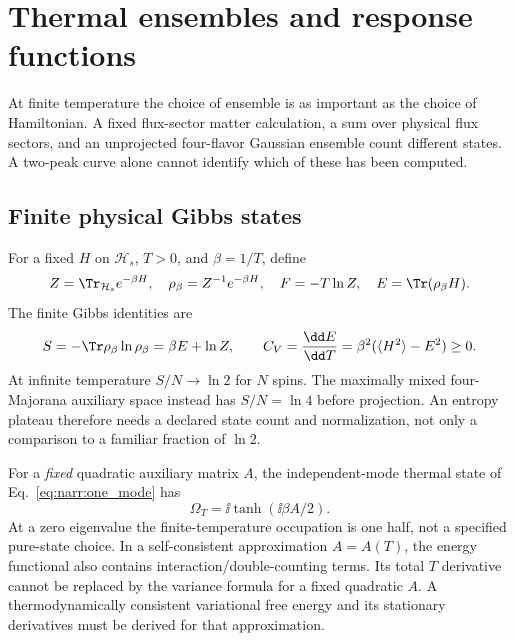 \chapter{Thermal ensembles and response functions}
\label{narr:thermal}

At finite temperature the choice of ensemble is as important as the choice of
Hamiltonian. A fixed flux-sector matter calculation, a sum over physical flux
sectors, and an unprojected four-flavor Gaussian ensemble count different states.
A two-peak curve alone cannot identify which of these has been computed.

\section{Finite physical Gibbs states}
For a fixed $H$ on $\mathcal H_s$, $T>0$, and $\beta=1/T$, define
\begin{equation}
 Z=\Tr_{\mathcal H_s}e^{-\beta H},\quad
 \rho_\beta=Z^{-1}e^{-\beta H},\quad
 F=-T\ln Z,\quad E=\Tr(\rho_\beta H).
\end{equation}
The finite Gibbs identities are
\begin{equation}
 S=-\Tr\rho_\beta\ln\rho_\beta=\beta E+\ln Z,
 \qquad C_V=\frac{\dd E}{\dd T}=\beta^2(\langle H^2\rangle-E^2)\geq0.
 \label{eq:narr:gibbs}
\end{equation}
At infinite temperature $S/N\to\ln2$ for $N$ spins. The maximally mixed
four-Majorana auxiliary space instead has $S/N=\ln4$ before projection.
An entropy plateau therefore needs a declared state count and normalization,
not only a comparison to a familiar fraction of $\ln2$.

For a \emph{fixed} quadratic auxiliary matrix $A$, the independent-mode thermal
state of Eq.~\eqref{eq:narr:one_mode} has
\begin{equation}
 \Omega_T=\ii\tanh(\ii\beta A/2).
 \label{eq:narr:thermal_covariance}
\end{equation}
At a zero eigenvalue the finite-temperature occupation is one half, not a
specified pure-state choice. In a self-consistent approximation $A=A(T)$, the
energy functional also contains interaction/double-counting terms. Its total
$T$ derivative cannot be replaced by the variance formula for a fixed quadratic
$A$. A thermodynamically consistent variational free energy and its stationary
derivatives must be derived for that approximation.


